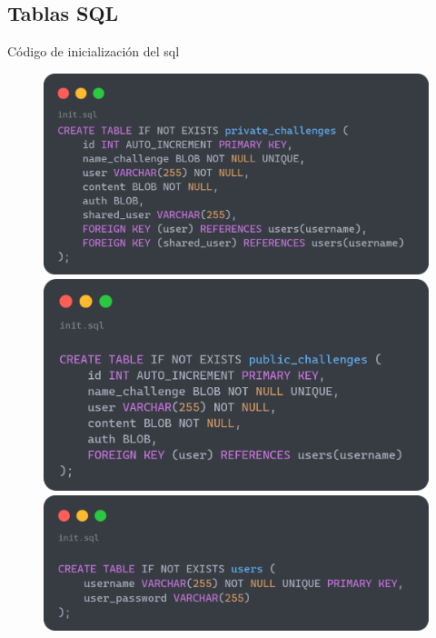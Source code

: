 \documentclass[a4paper,11pt]{article}
\begin{document}
\subsection{Tablas SQL}
    \label{sec:TablasSQL}
    Código de inicialización del sql
    \begin{figure}[htbp]
        \centering
        \begin{minipage}[t]{0.48\textwidth} %
            \centering
            \includegraphics[width=\textwidth]{images/privateChallenge.png}
        \end{minipage}
        \hfill
        \begin{minipage}[t]{0.48\textwidth} %
            \centering
            \includegraphics[width=\textwidth]{images/publicChallenge.png}
        \end{minipage}
        \vspace{0.5cm}
        \begin{minipage}[t]{0.7\textwidth} 
            \centering
            \includegraphics[width=\textwidth]{images/users.png}
        \end{minipage}
    \end{figure}
\end{document}
